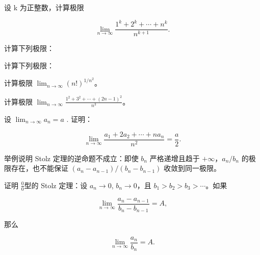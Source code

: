 \newpage
\noindent\begin{minipage}{\textwidth}
设 k 为正整数，计算极限

\[\lim_{n\to\infty}\frac{1^k+2^k+\cdots+n^k}{n^{k+1}}.\]
\end{minipage}\par\vfill
\noindent\begin{minipage}{\textwidth}
计算下列极限：
\end{minipage}\par\vfill
\noindent\begin{minipage}{\textwidth}
计算下列极限：
\end{minipage}\par\vfill
\newpage
\noindent\begin{minipage}{\textwidth}
计算极限 $\lim_{n\to\infty}(n!)^{1/n^2}$。
\end{minipage}\par\vfill
\noindent\begin{minipage}{\textwidth}
计算极限 $\lim_{n\to\infty}\frac{1^2+3^2+\cdots+(2n-1)^2}{n^3}$。
\end{minipage}\par\vfill
\noindent\begin{minipage}{\textwidth}
设  $ \lim_{n\to\infty}a_n=a $ . 证明：

\[\lim_{n\to\infty}\frac{a_{1}+2a_{2}+\cdots+na_{n}}{n^{2}}=\frac{a}{2}.\]
\end{minipage}\par\vfill
\newpage
\noindent\begin{minipage}{\textwidth}
举例说明 Stolz 定理的逆命题不成立：即使 $b_n$ 严格递增且趋于 $+\infty$，$a_n/b_n$ 的极限存在，也不能保证 $(a_n-a_{n-1})/(b_n-b_{n-1})$ 收敛到同一极限。
\end{minipage}\par\vfill
\noindent\begin{minipage}{\textwidth}
证明 $ \frac{0}{0} $型的 Stolz 定理：设  $ a_{n} \to 0 $,  $ b_{n} \to 0 $，且  $ b_{1} > b_{2} > b_{3} > \cdots $。如果

\[\lim_{n\to\infty}\frac{a_n-a_{n-1}}{b_n-b_{n-1}}=A,\]

那么

\[\lim_{n\to\infty}\frac{a_n}{b_n}=A.\]
\end{minipage}\par\vfill
